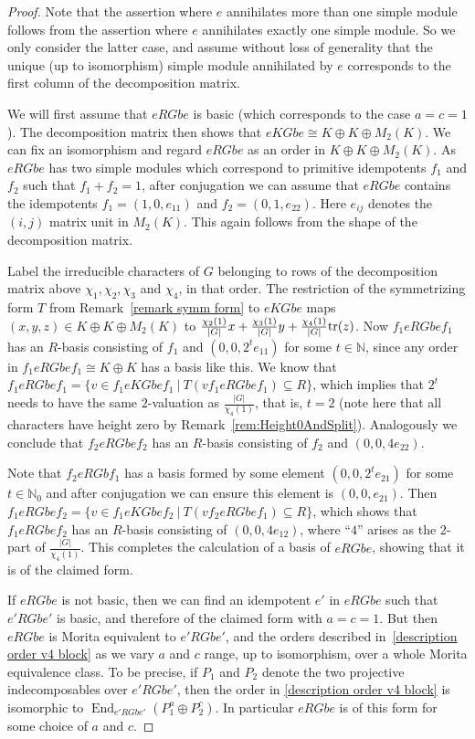 \documentclass[11pt, a4paper]{amsart}
\theoremstyle{definition}
\theoremstyle{definition}
\newcommand{\N}{\mathbb N}
\newcommand{\End}{\operatorname{End}}
\begin{document}
\begin{proof}
    Note that the assertion where $e$ annihilates more than one simple module follows from the assertion where $e$ annihilates exactly one simple module. So we only consider the latter case, and assume without loss of generality that the unique (up to isomorphism) simple module annihilated by $e$ corresponds to the first column of the decomposition matrix.
    
    We will first assume that $eRGbe$ is basic (which corresponds to the case $a=c=1$).  The decomposition matrix then shows that $eKGbe\cong K\oplus K \oplus M_2(K)$. We can fix an isomorphism and regard $eRGbe$ as an order in $K\oplus K \oplus M_2(K)$. As $eRGbe$ has two simple modules which correspond to primitive idempotents $f_1$ and $f_2$ such that $f_1 + f_2 =1$, after conjugation we can assume that $eRGbe$ contains the idempotents $f_1=(1,0,e_{11})$ and $f_2=(0,1,e_{22})$. Here $e_{ij}$ denotes the $(i,j)$ matrix unit in $M_2(K)$. This again follows from the shape of the decomposition matrix. 

    Label the irreducible characters of $G$ belonging to rows of the decomposition matrix above $\chi_1,\chi_2,\chi_3$ and $\chi_4$, in that order. The restriction of the symmetrizing form $T$ from Remark~\ref{remark symm form} to $eKGbe$ maps 
    $(x,y,z)\in K \oplus K \oplus M_2(K)$ to $\frac{\chi_2(1)}{|G|}x+\frac{\chi_3(1)}{|G|}y+\frac{\chi_4(1)}{|G|}{\rm tr}(z)$. Now $f_1eRGbef_1$ has an $R$-basis consisting of $f_1$ and $(0,0,2^te_{11})$ for some $t\in \N$, since any order in $f_1eRGbef_1\cong K\oplus K$ has a basis like this. We know that $f_1eRGbef_1=\{ v\in f_1eKGbef_1 \ | \ T(vf_1eRGbef_1)\subseteq R \}$, which implies that $2^t$ needs to have the same $2$-valuation as $\frac{|G|}{\chi_4(1)}$, that is, $t=2$ (note here that all characters have height zero by Remark~\ref{rem:Height0AndSplit}). Analogously we conclude that  $f_2eRGbef_2$ has an $R$-basis consisting of $f_2$ and $(0,0,4e_{22})$. 

    Note that $f_2eRGbf_1$ has a basis formed by some element $(0,0,2^t e_{21})$ for some $t \in \mathbb{N}_0$ and after conjugation we can ensure this element is $(0,0,e_{21})$. Then $f_1eRGbef_2=\{ v\in f_1eKGbef_2 \ | \ T(vf_2eRGbef_1)\subseteq R \}$, which shows that $f_1eRGbef_2$ has an $R$-basis consisting of $(0,0,4e_{12})$, where ``$4$''  arises as the $2$-part of $\frac{|G|}{\chi_4(1)}$. This completes the calculation of a basis of $eRGbe$, showing that it is of the claimed form.

    If $eRGbe$ is not basic, then we can find an idempotent $e'$ in $eRGbe$ such that $e'RGbe'$ is basic, and therefore of the claimed form with $a=c=1$. But then $eRGbe$ is Morita equivalent to $e'RGbe'$, and the orders described in~\eqref{description order v4 block} as we vary $a$ and $c$ range, up to isomorphism, over a whole Morita equivalence class. To be precise, if $P_1$ and $P_2$ denote the two projective indecomposables over $e'RGbe'$, then the order in \eqref{description order v4 block} is isomorphic to $\End_{e'RGbe'}(P_1^a\oplus P_2^c)$. In particular $eRGbe$ is of this form for some choice of $a$ and $c$. 
\end{proof}
\end{document}
